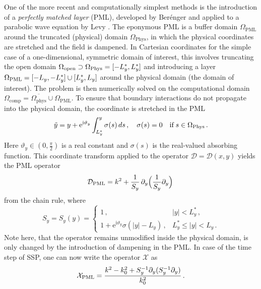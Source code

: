 \documentclass[11pt,a4paper]{article}
\newcommand{\iu}{\mathrm{i}} %
\newcommand{\cD}{\mathcal{D}}
\newcommand{\cX}{\mathcal{X}}
\theoremstyle{plain}%
\theoremstyle{definition}
\theoremstyle{remark}
\begin{document}
One of the more recent and computationally simplest methods is the introduction of a \textit{perfectly matched layer} (PML), developed by Ber\'enger \cite{berenger1994perfectly} and applied to a parabolic wave equation by Levy \cite{levy2001perfectly}. 
The eponymous PML is a buffer domain $\Omega_\mathrm{PML}$ around the truncated (physical) domain $\Omega_\mathrm{Phys}$, in which the physical coordinates are stretched and the field is dampened.
In Cartesian coordinates for the simple case of a one-dimensional, symmetric domain of interest, this involves truncating the open domain $\Omega_{\rm open} \supset \Omega_{\rm Phys} = [-L_y^*, L_y^*]$ and introducing a layer $\Omega_{\rm PML} = [-L_y, -L_y^*] \cup [L_y^*, L_y]$ around the physical domain (the domain of interest).
The problem is then numerically solved on the computational domain $\Omega_\mathrm{comp} = \overline{\Omega_\mathrm{phys}} \cup \Omega_\mathrm{PML}$.
To ensure that boundary interactions do not propagate into the physical domain, the coordinate is stretched in the PML
\begin{equation*}
    \tilde{y} = y + \mathrm{e}^{\iu\vartheta_y} \int_{L_y^*}^{y} \sigma(s) \,ds\,, \quad \sigma(s)=0 \quad \text{if} \; s \in \Omega_{\rm Phys}\,.
\end{equation*}
Here $\vartheta_y \in (0, \frac{\pi}{2})$ is a real constant and $\sigma(s)$ is the real-valued absorbing function.
This coordinate transform applied to the operator $\cD = \cD(x,y)$ yields the %
PML operator
\begin{equation*}
        \cD_\mathrm{PML} = k^2 + \frac{1}{S_y}\,\partial_y\Bigl(  \frac{1}{S_y}\partial_y \Bigr) \,
\end{equation*}
from the chain rule, where
\begin{equation}\label{eq:Sy}
    S_y = S_y(y) =
    \begin{cases}
        1\,, &|y| < L_y^* \, , \\
        1 + \mathrm{e}^{\iu \vartheta_y} \sigma(|y| - L_y)\,, & L_y^* \le |y| < L_y \,.
    \end{cases}
\end{equation}
Note here, that the operator remains unmodified inside the physical domain, is only changed by the introduction of dampening in the PML.
In case of the time step of SSP, one can now write the operator $\cX$ as
\begin{equation}\label{XPML}
    \cX_{\rm PML} = \frac{k^2 - k_0^2 + S_y^{-1}\partial_y (S_y^{-1} \partial_y)}{k_0^2}\,.
\end{equation}
\end{document}
